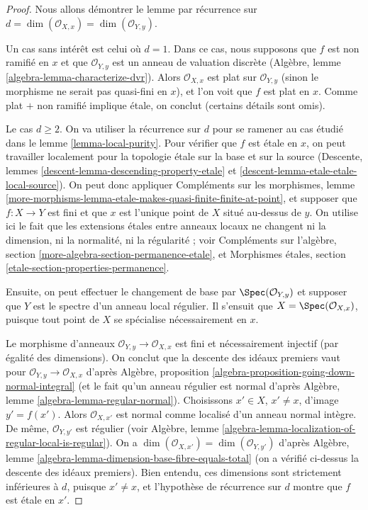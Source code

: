 \begin{proof}
Nous allons démontrer le lemme par récurrence sur
$d = \dim(\mathcal{O}_{X, x}) = \dim(\mathcal{O}_{Y, y})$.

\medskip\noindent
Un cas sans intérêt est celui où $d = 1$.
Dans ce cas, nous supposons que $f$ est non ramifié en $x$
et que $\mathcal{O}_{Y, y}$ est un anneau de valuation discrète
(Algèbre, lemme \ref{algebra-lemma-characterize-dvr}).
Alors $\mathcal{O}_{X, x}$ est plat sur $\mathcal{O}_{Y, y}$
(sinon le morphisme ne serait pas quasi-fini en $x$),
et l'on voit que $f$ est plat en $x$. Comme plat $+$
non ramifié implique étale, on conclut (certains détails sont omis).

\medskip\noindent
Le cas $d \geq 2$. On va utiliser la récurrence sur $d$ pour se ramener
au cas étudié dans le lemme \ref{lemma-local-purity}.
Pour vérifier que $f$ est étale en $x$, on peut travailler localement pour la topologie étale
sur la base et sur la source
(Descente, lemmes \ref{descent-lemma-descending-property-etale} et
\ref{descent-lemma-etale-etale-local-source}).
On peut donc appliquer Compléments sur les morphismes, lemme
\ref{more-morphisms-lemma-etale-makes-quasi-finite-finite-at-point},
et supposer que $f : X \to Y$ est fini et que $x$ est l'unique
point de $X$ situé au-dessus de $y$. On utilise ici le fait que les extensions étales entre
anneaux locaux ne changent ni la dimension, ni la normalité, ni la régularité ; voir
Compléments sur l'algèbre, section \ref{more-algebra-section-permanence-etale},
et
Morphismes étales, section \ref{etale-section-properties-permanence}.

\medskip\noindent
Ensuite, on peut effectuer le changement de base par $\Spec(\mathcal{O}_{Y, y})$
et supposer que $Y$ est le spectre d'un anneau local régulier.
Il s'ensuit que $X = \Spec(\mathcal{O}_{X, x})$, puisque
tout point de $X$ se spécialise nécessairement en $x$.

\medskip\noindent
Le morphisme d'anneaux $\mathcal{O}_{Y, y} \to \mathcal{O}_{X, x}$ est
fini et nécessairement injectif (par égalité des dimensions).
On conclut que la descente des idéaux premiers vaut pour
$\mathcal{O}_{Y, y} \to \mathcal{O}_{X, x}$ d'après
Algèbre, proposition \ref{algebra-proposition-going-down-normal-integral}
(et le fait qu'un anneau régulier est normal d'après
Algèbre, lemme \ref{algebra-lemma-regular-normal}).
Choisissons $x' \in X$, $x' \not = x$, d'image $y' = f(x')$.
Alors $\mathcal{O}_{X, x'}$ est normal comme localisé
d'un anneau normal intègre. De même, $\mathcal{O}_{Y, y'}$ est
régulier (voir Algèbre, lemme
\ref{algebra-lemma-localization-of-regular-local-is-regular}).
On a $\dim(\mathcal{O}_{X, x'}) = \dim(\mathcal{O}_{Y, y'})$ d'après
Algèbre, lemme \ref{algebra-lemma-dimension-base-fibre-equals-total}
(on a vérifié ci-dessus la descente des idéaux premiers).
Bien entendu, ces dimensions sont strictement inférieures à $d$, puisque $x' \not = x$,
et l'hypothèse de récurrence sur $d$ montre que $f$ est étale en $x'$.


\end{proof}
